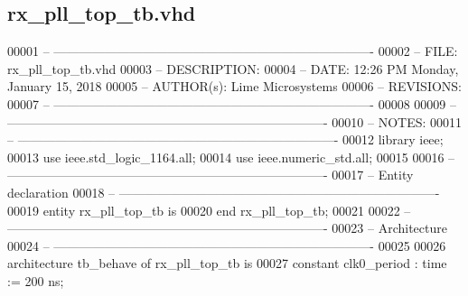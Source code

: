 \subsection{rx\+\_\+pll\+\_\+top\+\_\+tb.\+vhd}
\label{rx__pll__top__tb_8vhd_source}

\begin{DoxyCode}
00001 \textcolor{keyword}{-- ----------------------------------------------------------------------------}
00002 \textcolor{keyword}{-- FILE:          rx\_pll\_top\_tb.vhd}
00003 \textcolor{keyword}{-- DESCRIPTION:   }
00004 \textcolor{keyword}{-- DATE:          12:26 PM Monday, January 15, 2018}
00005 \textcolor{keyword}{-- AUTHOR(s):     Lime Microsystems}
00006 \textcolor{keyword}{-- REVISIONS:}
00007 \textcolor{keyword}{-- ----------------------------------------------------------------------------}
00008 
00009 \textcolor{keyword}{-- ----------------------------------------------------------------------------}
00010 \textcolor{keyword}{-- NOTES:}
00011 \textcolor{keyword}{-- ----------------------------------------------------------------------------}
00012 \textcolor{vhdlkeyword}{library }\textcolor{keywordflow}{ieee};
00013 \textcolor{vhdlkeyword}{use }ieee.std\_logic\_1164.\textcolor{keywordflow}{all};
00014 \textcolor{vhdlkeyword}{use }ieee.numeric\_std.\textcolor{keywordflow}{all};
00015 
00016 \textcolor{keyword}{-- ----------------------------------------------------------------------------}
00017 \textcolor{keyword}{-- Entity declaration}
00018 \textcolor{keyword}{-- ----------------------------------------------------------------------------}
00019 \textcolor{keywordflow}{entity }rx_pll_top_tb \textcolor{keywordflow}{is}
00020 \textcolor{keywordflow}{end} \textcolor{vhdlchar}{rx\_pll\_top\_tb};
00021 
00022 \textcolor{keyword}{-- ----------------------------------------------------------------------------}
00023 \textcolor{keyword}{-- Architecture}
00024 \textcolor{keyword}{-- ----------------------------------------------------------------------------}
00025 
00026 \textcolor{keywordflow}{architecture} tb\_behave \textcolor{keywordflow}{of} rx_pll_top_tb is
00027    \textcolor{keywordflow}{constant} \textcolor{vhdlchar}{clk0_period}    \textcolor{vhdlchar}{:} \textcolor{comment}{time} \textcolor{vhdlchar}{:=} \textcolor{vhdllogic}{}\textcolor{vhdllogic}{200} \textcolor{vhdlchar}{ns};

\end{DoxyCode}

